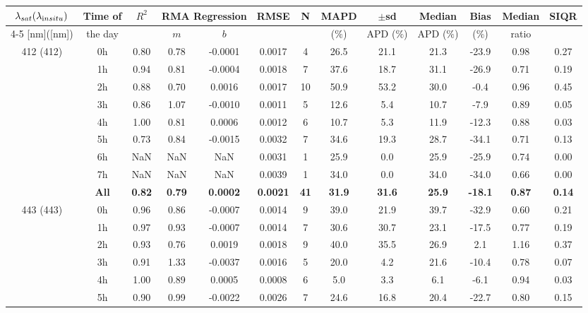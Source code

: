 \documentclass[preview]{standalone}
\begin{document}
\tiny

\tiny
\centering
\begin{tabular}{ccccccccccccc} 
 \hline 
$\lambda_{sat} (\lambda_{\text in situ})$ & Time of & $R^2$ & \multicolumn{2}{c}{RMA Regression} & RMSE & N & MAPD & $\pm$sd & Median & Bias & Median & SIQR \\ \cline{4-5}
[nm]([nm])                  &  the day            &         & $m$     & $b$     &             &     & ($\%$)  & APD ($\%$)  & APD ($\%$)  & ($\%$)   & ratio   &         \\ \hline 
 \hline 
\multirow{9}{*}{412 (412)} & 0h & 0.80 & 0.78 & -0.0001 & 0.0017 &  4 & 26.5 & 21.1 & 21.3 & -23.9 & 0.98 & 0.27 \\ 
 & 1h & 0.94 & 0.81 & -0.0004 & 0.0018 &  7 & 37.6 & 18.7 & 31.1 & -26.9 & 0.71 & 0.19 \\ 
 & 2h & 0.88 & 0.70 & 0.0016 & 0.0017 & 10 & 50.9 & 53.2 & 30.0 & -0.4 & 0.96 & 0.45 \\ 
 & 3h & 0.86 & 1.07 & -0.0010 & 0.0011 &  5 & 12.6 & 5.4 & 10.7 & -7.9 & 0.89 & 0.05 \\ 
 & 4h & 1.00 & 0.81 & 0.0006 & 0.0012 &  6 & 10.7 & 5.3 & 11.9 & -12.3 & 0.88 & 0.03 \\ 
 & 5h & 0.73 & 0.84 & -0.0015 & 0.0032 &  7 & 34.6 & 19.3 & 28.7 & -34.1 & 0.71 & 0.13 \\ 
 & 6h & NaN & NaN & NaN & 0.0031 &  1 & 25.9 & 0.0 & 25.9 & -25.9 & 0.74 & 0.00 \\ 
 & 7h & NaN & NaN & NaN & 0.0039 &  1 & 34.0 & 0.0 & 34.0 & -34.0 & 0.66 & 0.00 \\ \cline{2-13}
 & \textbf{All} & \textbf{0.82} & \textbf{0.79} & \textbf{0.0002} & \textbf{0.0021} & \textbf{41} & \textbf{31.9} & \textbf{31.6} & \textbf{25.9} & \textbf{-18.1} & \textbf{0.87} & \textbf{0.14} \\ \hline
\multirow{9}{*}{443 (443)} & 0h & 0.96 & 0.86 & -0.0007 & 0.0014 &  9 & 39.0 & 21.9 & 39.7 & -32.9 & 0.60 & 0.21 \\ 
 & 1h & 0.97 & 0.93 & -0.0007 & 0.0014 &  7 & 30.6 & 30.7 & 23.1 & -17.5 & 0.77 & 0.19 \\ 
 & 2h & 0.93 & 0.76 & 0.0019 & 0.0018 &  9 & 40.0 & 35.5 & 26.9 & 2.1 & 1.16 & 0.37 \\ 
 & 3h & 0.91 & 1.33 & -0.0037 & 0.0016 &  5 & 20.0 & 4.2 & 21.6 & -10.4 & 0.78 & 0.07 \\ 
 & 4h & 1.00 & 0.89 & 0.0005 & 0.0008 &  6 & 5.0 & 3.3 & 6.1 & -6.1 & 0.94 & 0.03 \\ 
 & 5h & 0.90 & 0.99 & -0.0022 & 0.0026 &  7 & 24.6 & 16.8 & 20.4 & -22.7 & 0.80 & 0.15 \\ 

\end{tabular}
\end{document}
